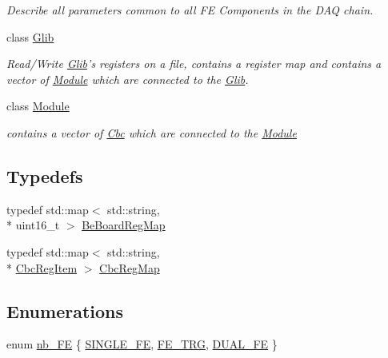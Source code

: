 \begin{DoxyCompactItemize}
\begin{DoxyCompactList}\small\item\em Describe all parameters common to all F\-E Components in the D\-A\-Q chain. \end{DoxyCompactList}\item 
class \hyperlink{class_ph2___hw_description_1_1_glib}{Glib}
\begin{DoxyCompactList}\small\item\em Read/\-Write \hyperlink{class_ph2___hw_description_1_1_glib}{Glib}'s registers on a file, contains a register map and contains a vector of \hyperlink{class_ph2___hw_description_1_1_module}{Module} which are connected to the \hyperlink{class_ph2___hw_description_1_1_glib}{Glib}. \end{DoxyCompactList}\item 
class \hyperlink{class_ph2___hw_description_1_1_module}{Module}
\begin{DoxyCompactList}\small\item\em contains a vector of \hyperlink{class_ph2___hw_description_1_1_cbc}{Cbc} which are connected to the \hyperlink{class_ph2___hw_description_1_1_module}{Module} \end{DoxyCompactList}\end{DoxyCompactItemize}
\subsection*{Typedefs}
\begin{DoxyCompactItemize}
\item 
typedef std\-::map$<$ std\-::string, \\*
uint16\-\_\-t $>$ \hyperlink{namespace_ph2___hw_description_a2e13fb82c8ed98154c60f9d0f8467d72}{Be\-Board\-Reg\-Map}
\item 
typedef std\-::map$<$ std\-::string, \\*
\hyperlink{struct_ph2___hw_description_1_1_cbc_reg_item}{Cbc\-Reg\-Item} $>$ \hyperlink{namespace_ph2___hw_description_a9a23b373068f169aa67ca1d22c9a6001}{Cbc\-Reg\-Map}
\end{DoxyCompactItemize}
\subsection*{Enumerations}
\begin{DoxyCompactItemize}
\item 
enum \hyperlink{namespace_ph2___hw_description_a891c19542f306c932b747f42fe48fc2b}{nb\-\_\-\-F\-E} \{ \hyperlink{namespace_ph2___hw_description_a891c19542f306c932b747f42fe48fc2baa30d72f6d58dc25b003fbf8bf56b3ace}{S\-I\-N\-G\-L\-E\-\_\-\-F\-E}, 
\hyperlink{namespace_ph2___hw_description_a891c19542f306c932b747f42fe48fc2ba6e0b877d015d017f61b07618e057c452}{F\-E\-\_\-\-T\-R\-G}, 
\hyperlink{namespace_ph2___hw_description_a891c19542f306c932b747f42fe48fc2bae3b57cb16641bb367bfc57a00315a4ca}{D\-U\-A\-L\-\_\-\-F\-E}
 \}
\end{DoxyCompactItemize}


